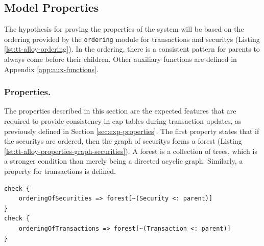 \subsection{Model Properties}


The hypothesis for proving the properties of the system  will be based on the ordering provided by the \verb|ordering| module for \glspl{transaction} and \glspl{security} (Listing \ref{lst:tt-alloy-ordering}). In the ordering, there is a consistent pattern for parents to always come before their children. Other auxiliary functions are defined in Appendix \ref{app:aux-functions}.


\begin{listing}[!h]
	\caption{Ordering of Securities and \glspl{transaction}}
\label{lst:tt-alloy-ordering}
\end{listing}

\subsubsection{Properties.}

The properties described in this section are the expected features that are required to provide consistency in cap tables during transaction updates, as previously defined in Section \ref{sec:exp-properties}.
%
The first property states that if the \glspl{security} are ordered, then the graph of \glspl{security} forms a forest (Listing \ref{lst:tt-alloy-properties-graph-securities}). A forest is a collection of trees, which is a stronger condition than merely being a directed acyclic graph. Similarly, a property for \glspl{transaction} is defined.

\begin{listing}[!h]
	\begin{verbatim}
check {
    orderingOfSecurities => forest[~(Security <: parent)]
}
check {
    orderingOfTransactions => forest[~(Transaction <: parent)]
}
\end{verbatim}
	\caption{Forest of Securities and Transactions}
\label{lst:tt-alloy-properties-graph-securities}
\label{lst:tt-alloy-properties-graph-transactions}
\end{listing}

